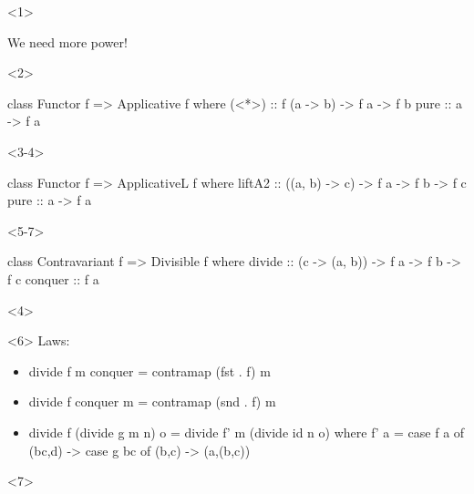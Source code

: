 \documentclass[UKenglish,usenames,dvipsnames,svgnames,table,aspectratio=169,mathserif]{beamer}
\newcommand{\nl}{\vspace{\baselineskip}}
\begin{document}
\begin{frame}[fragile]
\begin{overlayarea}{\textwidth}{0.2\textheight}
\begin{onlyenv}<1>
\nl
\huge
\begin{center}
We need more power!
\end{center}
\end{onlyenv}
\begin{onlyenv}<2>
\begin{haskellcode}
class Functor f => Applicative  f where
  (<*>)  :: f (a -> b)    -> f a -> f b
  pure   :: a -> f a
\end{haskellcode}
\end{onlyenv}
\begin{onlyenv}<3-4>
\begin{haskellcode}
class Functor f => ApplicativeL f where
  liftA2 :: ((a, b) -> c) -> f a -> f b -> f c
  pure   :: a -> f a
\end{haskellcode}
\end{onlyenv}
\begin{onlyenv}<5-7>
\begin{haskellcode}
class Contravariant f => Divisible f where
  divide  :: (c -> (a, b)) -> f a -> f b -> f c
  conquer :: f a
\end{haskellcode}
\end{onlyenv}
\end{overlayarea}

\nl

\begin{overlayarea}{\textwidth}{0.2\textheight}
\begin{onlyenv}<4>
\end{onlyenv}

\begin{onlyenv}<6>
\small
Laws:

\begin{itemize}
\item[]
\begin{haskellcode}
divide f m conquer = contramap (fst . f) m
\end{haskellcode}
\item[]
\begin{haskellcode}
divide f conquer m = contramap (snd . f) m
\end{haskellcode}
\item[]
\begin{haskellcode}
divide f (divide g m n) o = divide f' m (divide id n o)
  where
    f' a = case f a of (bc,d) -> case g bc of (b,c) -> (a,(b,c))
\end{haskellcode}
\end{itemize}
\end{onlyenv}
\begin{onlyenv}<7>
\end{onlyenv}
\end{overlayarea}
\end{frame}
\end{document}
